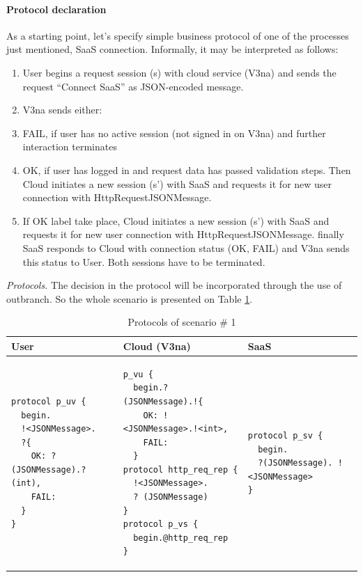 \documentclass{llncs}
\begin{document}
\paragraph{Protocol declaration} As a starting point, let's specify simple business protocol of one of the processes just mentioned, SaaS connection. Informally, it may be interpreted as follows:
\begin{enumerate}
\item  User begins a request session (s) with cloud service (V3na) and sends the request ``Connect SaaS'' as JSON-encoded message.

\item  V3na sends either:

\item  FAIL, if user has no active session (not signed in on V3na) and further interaction terminates 

\item  OK, if user has logged in and request data has passed validation steps. Then Cloud initiates a new session (s') with SaaS and requests it for new user connection with HttpRequestJSONMessage.

\item  If OK label take place, Cloud initiates a new session (s') with SaaS and requests it for new user connection with HttpRequestJSONMessage. finally SaaS responds to Cloud with connection status (OK, FAIL) and V3na sends this status to User. Both sessions have to be terminated.
\end{enumerate}

\textit{Protocols.} The decision in the protocol will be incorporated through the use of outbranch. So the whole scenario is presented on Table \ref{tab:protocols-sc1}.

{
\lstset{
framerule=0pt,
numbers=none
}
\begin{longtable}{|p{}|p{}|p{}|}
\caption{Protocols of scenario \# 1}
\label{tab:protocols-sc1} \\ \hline
User & Cloud (V3na) & SaaS \\ \hline
\endhead

\begin{lstlisting}
protocol p_uv { 
  begin.
  !<JSONMessage>. 
  ?{
    OK: ?(JSONMessage).?(int),
    FAIL: 
  }
}
\end{lstlisting}
&
\begin{lstlisting}
p_vu { 
  begin.?(JSONMessage).!{
    OK: !<JSONMessage>.!<int>,
    FAIL: 
  }
protocol http_req_rep {
  !<JSONMessage>.
  ? (JSONMessage)
}
protocol p_vs { 
  begin.@http_req_rep 
}
\end{lstlisting}
&
\begin{lstlisting}
protocol p_sv { 
  begin.
  ?(JSONMessage). !<JSONMessage> 
}
\end{lstlisting}
\\ \hline
\end{longtable}
}
\end{document}
